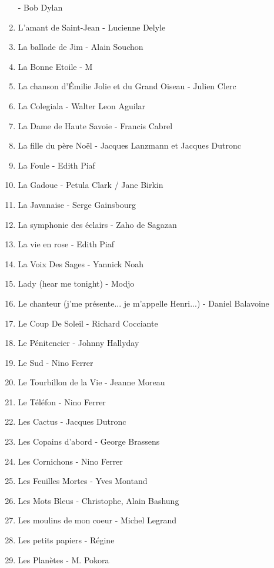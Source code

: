 \documentclass[12pt]{extarticle}
\begin{document}
\begin{multicols}{2}
\begin{enumerate}[nolistsep]
        - Bob Dylan
\item   L'amant de Saint-Jean
        - Lucienne Delyle
\item   La ballade de Jim
        - Alain Souchon
\item   La Bonne Etoile
        - M
\item   La chanson d'Émilie Jolie et du Grand Oiseau
        - Julien Clerc
\item   La Colegiala
        - Walter Leon Aguilar
\item   La Dame de Haute Savoie
        - Francis Cabrel
\item   La fille du père Noël
        - Jacques Lanzmann et Jacques Dutronc
\item   La Foule
        - Edith Piaf
\item   La Gadoue
        - Petula Clark / Jane Birkin
\item   La Javanaise
        - Serge Gainsbourg
\item   La symphonie des éclairs
        - Zaho de Sagazan
\item   La vie en rose
        - Edith Piaf
\item   La Voix Des Sages
        - Yannick Noah
\item   Lady (hear me tonight)
        - Modjo
\item   Le chanteur (j'me présente... je m'appelle Henri...)
        - Daniel Balavoine
\item   Le Coup De Soleil
        - Richard Cocciante
\item   Le Pénitencier
        - Johnny Hallyday
\item   Le Sud
        - Nino Ferrer
\item   Le Tourbillon de la Vie
        - Jeanne Moreau
\item   Le Téléfon
        - Nino Ferrer
\item   Les Cactus
        - Jacques Dutronc
\item   Les Copains d'abord
        - George Brassens
\item   Les Cornichons
        - Nino Ferrer
\item   Les Feuilles Mortes
        - Yves Montand
\item   Les Mots Bleus
        - Christophe, Alain Bashung
\item   Les moulins de mon coeur
        - Michel Legrand
\item   Les petits papiers
        - Régine
\item   Les Planètes
        - M. Pokora

\end{enumerate}
\end{multicols}
\end{document}
